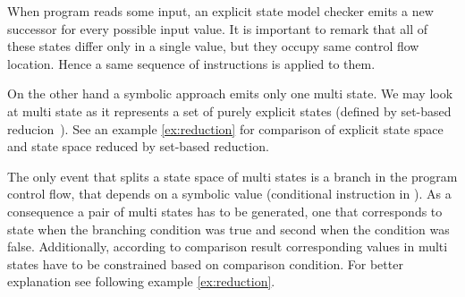 When program reads some input, an explicit state model checker emits a
new successor for every possible input value. It is important to remark that all of
these states differ only in a single value, but they occupy same control flow
location. Hence a same sequence of instructions is applied to them.


On the other hand a symbolic approach emits only one multi state. We may look at
multi state as it represents a set of purely explicit states (defined by
set-based reducion~\cite{Havel14}). See an example \ref{ex:reduction} for comparison of
explicit state space and state space reduced by set-based reduction.

The only event that splits a state space of multi states is a branch in the
program control flow, that depends on a symbolic value (conditional 
instruction in \LLVM). As a consequence a pair of multi states has to be
generated, one that corresponds to state when the branching condition was true and
second when the condition was false. Additionally, according to comparison result
corresponding values in multi states have to be constrained based on comparison
condition. For better explanation see following example \ref{ex:reduction}.

